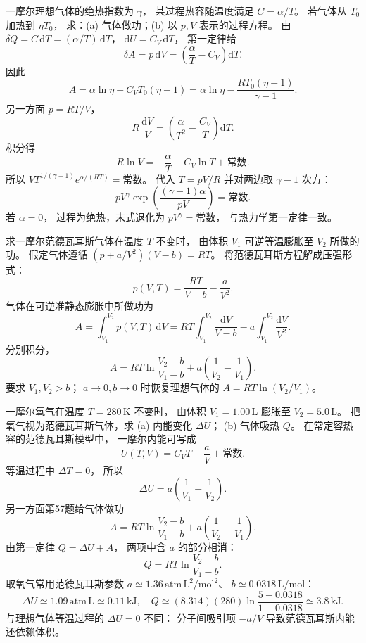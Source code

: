 一摩尔理想气体的绝热指数为 $\gamma$，
某过程热容随温度满足 $C=\alpha/T$。
若气体从 $T_0$ 加热到 $\eta T_0$，
求：(a) 气体做功；(b) 以 $p,V$ 表示的过程方程。
\exsolution
由
$\delta Q=C\,\mathrm dT=(\alpha/T)\,\mathrm dT$，
$\mathrm dU=C_V\,\mathrm dT$，
第一定律给
\[
\delta A=p\,\mathrm dV
=\left(\frac{\alpha}{T}-C_V\right)\mathrm dT.
\]
因此
\[
\boxed{A=\alpha\ln\eta-C_VT_0(\eta-1)
=\alpha\ln\eta-\frac{RT_0(\eta-1)}{\gamma-1}}.
\]
另一方面 $p=RT/V$，
\[
R\,\frac{\mathrm dV}{V}
=\left(\frac{\alpha}{T^2}-\frac{C_V}{T}\right)\mathrm dT.
\]
积分得
\[
R\ln V=-\frac\alpha T-C_V\ln T+\text{常数}.
\]
所以
$V T^{1/(\gamma-1)}e^{\alpha/(RT)}=\text{常数}$。
代入 $T=pV/R$ 并对两边取
$\gamma-1$ 次方：
\[
\boxed{pV^\gamma
\exp\left(\frac{(\gamma-1)\alpha}{pV}\right)
=\text{常数}}.
\]
\excheck 若 $\alpha=0$，
过程为绝热，末式退化为
$pV^\gamma=\text{常数}$，
与热力学第一定律一致。

求一摩尔范德瓦耳斯气体在温度 $T$ 不变时，
由体积 $V_1$ 可逆等温膨胀至 $V_2$ 所做的功。
假定气体遵循
$(p+a/V^2)(V-b)=RT$。
\exsolution
将范德瓦耳斯方程解成压强形式：
\[
p(V,T)=\frac{RT}{V-b}-\frac a{V^2}.
\]
气体在可逆准静态膨胀中所做功为
\[
A=\int_{V_1}^{V_2}p(V,T)\,\mathrm dV
=RT\int_{V_1}^{V_2}\frac{\mathrm dV}{V-b}
-a\int_{V_1}^{V_2}\frac{\mathrm dV}{V^2}.
\]
分别积分，
\[
\boxed{A=
RT\ln\frac{V_2-b}{V_1-b}
+a\left(\frac1{V_2}-\frac1{V_1}\right)}.
\]
\excheck 要求 $V_1,V_2>b$；
$a\to0,b\to0$ 时恢复理想气体的
$A=RT\ln(V_2/V_1)$。

一摩尔氧气在温度
$T=280\,\mathrm K$ 不变时，
由体积 $V_1=1.00\,\mathrm L$
膨胀至 $V_2=5.0\,\mathrm L$。
把氧气视为范德瓦耳斯气体，求
(a) 内能变化 $\Delta U$；
(b) 气体吸热 $Q$。
\exsolution
在常定容热容的范德瓦耳斯模型中，
一摩尔内能可写成
\[
U(T,V)=C_VT-\frac aV+\text{常数}.
\]
等温过程中 $\Delta T=0$，
所以
\[
\boxed{\Delta U=a\left(\frac1{V_1}-\frac1{V_2}\right)}.
\]
另一方面第57题给气体做功
\[
A=RT\ln\frac{V_2-b}{V_1-b}
+a\left(\frac1{V_2}-\frac1{V_1}\right).
\]
由第一定律 $Q=\Delta U+A$，
两项中含 $a$ 的部分相消：
\[
\boxed{Q=RT\ln\frac{V_2-b}{V_1-b}}.
\]
取氧气常用范德瓦耳斯参数
$a\simeq1.36\,\mathrm{atm\,L^2/mol^2}$、
$b\simeq0.0318\,\mathrm{L/mol}$：
\[
\Delta U\simeq1.09\,\mathrm{atm\,L}
\simeq\boxed{0.11\,\mathrm{kJ}},
\quad
Q\simeq(8.314)(280)
\ln\frac{5-0.0318}{1-0.0318}
\simeq\boxed{3.8\,\mathrm{kJ}}.
\]
\excheck 与理想气体等温过程的 $\Delta U=0$ 不同：
分子间吸引项 $-a/V$ 导致范德瓦耳斯内能
还依赖体积。

